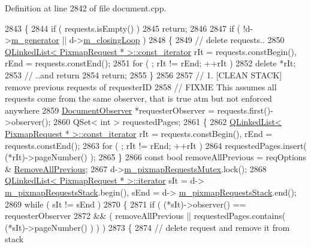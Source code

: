 Definition at line 2842 of file document.\+cpp.


\begin{DoxyCode}
2843 \{
2844     \textcolor{keywordflow}{if} ( requests.isEmpty() )
2845         \textcolor{keywordflow}{return};
2846 
2847     \textcolor{keywordflow}{if} ( !d->\hyperlink{classOkular_1_1DocumentPrivate_a52083f79ce95756ddea060e74315e91f}{m\_generator} || d->\hyperlink{classOkular_1_1DocumentPrivate_a836cb1b614d8d25bad8403dfd746ef00}{m\_closingLoop} )
2848     \{
2849         \textcolor{comment}{// delete requests..}
2850         \hyperlink{classQLinkedList}{QLinkedList< PixmapRequest * >::const\_iterator} rIt = 
      requests.constBegin(), rEnd = requests.constEnd();
2851         \textcolor{keywordflow}{for} ( ; rIt != rEnd; ++rIt )
2852             \textcolor{keyword}{delete} *rIt;
2853         \textcolor{comment}{// ..and return}
2854         \textcolor{keywordflow}{return};
2855     \}
2856 
2857     \textcolor{comment}{// 1. [CLEAN STACK] remove previous requests of requesterID}
2858     \textcolor{comment}{// FIXME This assumes all requests come from the same observer, that is true atm but not enforced
       anywhere}
2859     \hyperlink{classOkular_1_1DocumentObserver}{DocumentObserver} *requesterObserver = requests.first()->observer();
2860     QSet< int > requestedPages;
2861     \{
2862         \hyperlink{classQLinkedList}{QLinkedList< PixmapRequest * >::const\_iterator} rIt = 
      requests.constBegin(), rEnd = requests.constEnd();
2863         \textcolor{keywordflow}{for} ( ; rIt != rEnd; ++rIt )
2864             requestedPages.insert( (*rIt)->pageNumber() );
2865     \}
2866     \textcolor{keyword}{const} \textcolor{keywordtype}{bool} removeAllPrevious = reqOptions & \hyperlink{classOkular_1_1Document_a34c1f67c024cfbdd46379c5fac3674d7a3e895c552ec2119c4a743aaefa3d00af}{RemoveAllPrevious};
2867     d->\hyperlink{classOkular_1_1DocumentPrivate_a5c0e919d575a7a3c19a42c64a672fce4}{m\_pixmapRequestsMutex}.lock();
2868     \hyperlink{classQLinkedList}{QLinkedList< PixmapRequest * >::iterator} sIt = d->
      \hyperlink{classOkular_1_1DocumentPrivate_af903e531960617af53b4bc79b3a95efa}{m\_pixmapRequestsStack}.begin(), sEnd = d->
      \hyperlink{classOkular_1_1DocumentPrivate_af903e531960617af53b4bc79b3a95efa}{m\_pixmapRequestsStack}.end();
2869     \textcolor{keywordflow}{while} ( sIt != sEnd )
2870     \{
2871         \textcolor{keywordflow}{if} ( (*sIt)->observer() == requesterObserver
2872              && ( removeAllPrevious || requestedPages.contains( (*sIt)->pageNumber() ) ) )
2873         \{
2874             \textcolor{comment}{// delete request and remove it from stack}

\end{DoxyCode}
